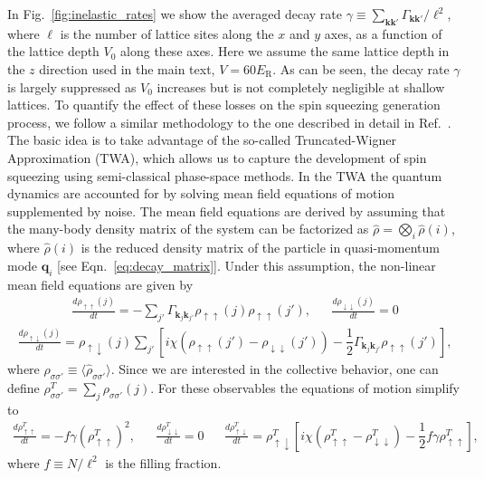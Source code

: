 \documentclass{nature}
\newcommand{\f}[2]{\dfrac{#1}{#2}} %
\renewcommand{\sp}[1]{\left[#1\right]} %
\newcommand{\up}{\uparrow}
\newcommand{\dn}{\downarrow}
\begin{document}
In Fig.~\ref{fig:inelastic_rates} we show  the averaged decay rate $\gamma\equiv\sum_{{\bm k}{\bm k'}}\Gamma_{{\bm k}{\bm k'}}/\ell^2$, where $\ell$ is the number of lattice sites along the $x$ and $y$ axes, as a function of the  lattice depth $V_0$ along these axes. Here we assume  the same lattice depth  in the $z$ direction used in the main text, $V=60E_{\text{R}}$.  As can be seen, the decay rate $\gamma$ is largely suppressed as $V_0$ increases  but is not completely negligible at shallow lattices.
To quantify the effect of these losses on the spin squeezing generation process, we follow a similar methodology to the one described in detail in Ref.~\cite{rey2014probing}. The basic idea is to take advantage of the so-called Truncated-Wigner Approximation (TWA)\cite{polkovnikov2010phase, schachenmayer2015manybody}, which allows us to capture the development of spin squeezing using semi-classical phase-space methods. In the  TWA the quantum dynamics are accounted for by solving mean field equations of motion supplemented by noise. The mean field equations are  derived by assuming that the many-body density matrix of the system can be factorized as
$\hat{\rho}= \bigotimes_{i} \hat{\rho}({i})$, where $\hat{\rho}(i)$ is the reduced density matrix of the  particle in quasi-momentum  mode  ${\bm q}_i$ [see Eqn.~\eqref{eq:decay_matrix}]. Under this assumption, the non-linear mean field equations are given by
\begin{align}
  \frac{d\rho_{\up\up}(j)}{dt}
  = -\sum_{j'}\Gamma_{{\bm k}_j{\bm k}_{j'}}
  \rho_{\up\up}(j) \rho_{\up\up}(j'),
  &&
  \frac{d\rho_{\dn \dn}(j)}{dt}=0
\end{align}
\begin{align}
  \frac{d\rho_{\up\dn}(j)}{dt}
  = \rho_{\up\dn}(j) \sum_{j'}
  \sp{i\chi(\rho_{\up\up}(j')-\rho_{\dn\dn}(j'))
  - \f12 \Gamma_{{\bm k}_j{\bm k}_{j'}} \rho_{\up\up}(j')},
\end{align}
where $\rho_{\sigma\sigma'}\equiv\langle\hat{\rho}_{\sigma\sigma'}\rangle$.
Since we are interested in the collective behavior, one can define $\rho_{\sigma\sigma'}^T=\sum_j \rho_{\sigma\sigma'}(j)$. For these observables the equations of motion simplify to
\begin{align}
  \frac{d\rho_{\up\up}^T}{dt} = -f\gamma  (\rho_{\up\up}^T)^2,
  && \frac{d\rho_{\dn \dn}^T}{dt} = 0
  &&
  \frac{d\rho_{\up\dn}^T}{dt}
  = \rho_{\up\dn}^T
  \sp{i\chi(\rho_{\up\up}^T-\rho_{\dn\dn}^T)
    - \f12 f\gamma \rho_{\up\up}^T},
\end{align}
where $f\equiv N/\ell^2$ is the filling fraction.
\end{document}
